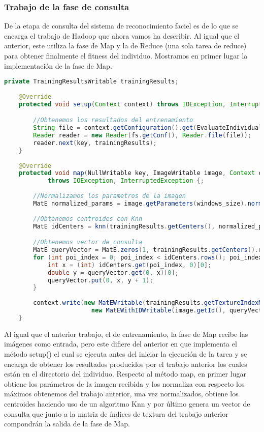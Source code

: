 \subsubsection{Trabajo de la fase de consulta}

De la etapa de consulta del sistema de reconocimiento faciel es de lo que se encarga el trabajo de Hadoop que ahora vamos ha describir. Al igual que el anterior, este utiliza la fase de Map y la de Reduce (una sola tarea de reduce) para obtener finalmente el fitness del individuo. Mostramos en primer lugar la implementación de la fase de Map.

 \begin{lstlisting}[language=Java]
 	private TrainingResultsWritable trainingResults;
 
	@Override
	protected void setup(Context context) throws IOException, InterruptedException {

		//Obtenemos los resultados del entrenamiento
		String file = context.getConfiguration().get(EvaluateIndividual.INDIVIDUAL_DIR_PARAM).concat("training/part-r-00000");
		Reader reader = new Reader(fs.getConf(), Reader.file(file));
		reader.next(key, trainingResults);
	}
	
	@Override
	protected void map(NullWritable key, ImageWritable image, Context context)
			throws IOException, InterruptedException {;
		
		//Normalizamos los parametros de la imagen
		MatE normalized_params = image.getParameters(windows_size).normalize(trainingResults.getMaxPerCol());
		
		//Obtenemos centroides con Knn
		MatE idCenters = knn(trainingResults.getCenters(), normalized_params);

		//Obtenemos vector de consulta		
		MatE queryVector = MatE.zeros(1, trainingResults.getCenters().rows(), CvType.CV_64F);
		for (int poi_index = 0; poi_index < idCenters.rows(); poi_index++) {
			int x = (int) idCenters.get(poi_index, 0)[0];
			double y = queryVector.get(0, x)[0];
			queryVector.put(0, x, y + 1);
		}
		
		context.write(new MatEWritable(trainingResults.getTextureIndexMatrix()), 
						new MatEWithIDWritable(image.getId(), queryVector));
	}
\end{lstlisting}

Al igual que el anterior trabajo, el de entrenamiento, la fase de Map recibe las imágenes como entrada, pero este difiere del anterior en que implementa el método setup() el cual se ejecuta antes del iniciar la ejecución de la tarea y se encarga de obtener los resultados producidos por el trabajo anterior los cuales están en el directorio del individuo. Respecto al método map, en primer lugar obtiene los parámetros de la imagen recibida y los normaliza con respecto los máximos obtenemos del trabajo anterior, una vez normalizados, obtiene los centroides haciendo uso de un algoritmo Knn y por \'ultimo genera un vector de consulta que junto a la matriz de \'indices de textura del trabajo anterior compondrán la salida de la fase de Map.

